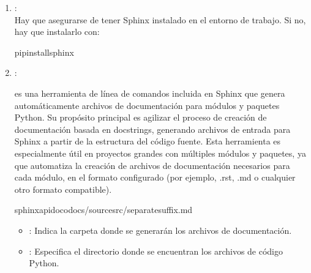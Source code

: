 \documentclass[a4paper,10pt,spanish]{sphinxmanual}
\begin{document}
\label{\detokenize{configuracion_inicial/007.Creacion_de_ficheros_de_codigo_y_generacion_automatica_de_documentacion:pasos-para-generar-la-documentacion-automaticamente}}\begin{enumerate}
%
\item {} 
\sphinxAtStartPar
{}:\\
Hay que asegurarse de tener Sphinx instalado en el entorno de trabajo. Si no, hay que instalarlo con:

\begin{sphinxVerbatim}[commandchars=\\\{\}]
pipinstallsphinx
\end{sphinxVerbatim}

\item {} 
\sphinxAtStartPar
{}:

\sphinxAtStartPar
{} es una herramienta de línea de comandos incluida en Sphinx que genera automáticamente archivos de documentación para módulos y paquetes Python.
Su propósito principal es agilizar el proceso de creación de documentación basada en docstrings, generando archivos de entrada para Sphinx a partir de la estructura del código fuente.
Esta herramienta es especialmente útil en proyectos grandes con múltiples módulos y paquetes, ya que automatiza la creación de archivos de documentación necesarios para cada módulo, en el formato configurado (por ejemplo, .rst, .md o cualquier otro formato compatible).

\begin{sphinxVerbatim}[commandchars=\\\{\}]
sphinx\PYGZhy{}apidoc\PYGZhy{}odocs/sourcesrc/\PYGZhy{}\PYGZhy{}separate\PYGZhy{}\PYGZhy{}suffix.md
\end{sphinxVerbatim}
\begin{itemize}
\item {} 
\sphinxAtStartPar
{}: Indica la carpeta donde se generarán los archivos de documentación.

\item {} 
\sphinxAtStartPar
{}: Especifica el directorio donde se encuentran los archivos de código Python.


\end{itemize}
\end{enumerate}
\end{document}
